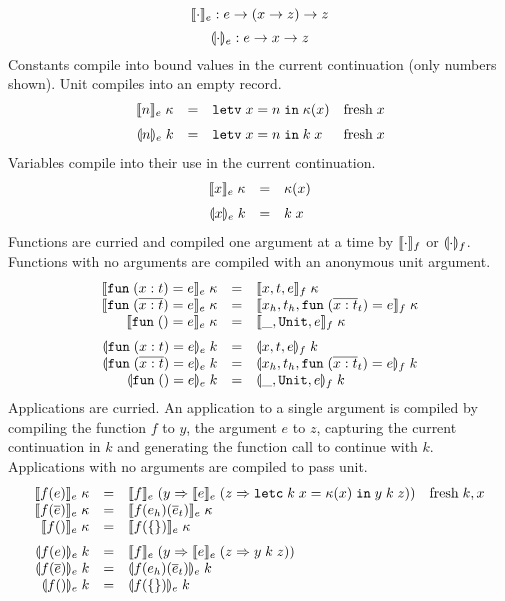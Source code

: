 \documentclass[11pt]{article}
\begin{document}
\[
    \llbracket \cdot \rrbracket_e : e -> (x -> z) -> z
\]
\[
    \llparenthesis \cdot \rrparenthesis_e : e -> x -> z
\]
Constants compile into bound values in the current continuation (only numbers shown).
Unit compiles into an empty record.
\[
\begin{array}{rcll}
\cmpk{e}{\nume{n}} & = &
  \letv{x}{n}{\kappa(x)}   & \fresh{x} \medskip \\

\tcmpk{e}{\nume{n}} & = &
  \letv{x}{n}{\appc{k}{x}} & \fresh{x} \\
\end{array}
\]
Variables compile into their use in the current continuation.
\[
\begin{array}{rcll}
\cmpk{e}{\idne{x}} & = &
  \kappa(x) \medskip \\

\tcmpk{e}{\idne{x}} & = &
  \appc{k}{x} \\
\end{array}
\]
Functions are curried and compiled one argument at a time by $\llbracket \cdot \rrbracket_f$ or $\llparenthesis \cdot \rrparenthesis_f$.
Functions with no arguments are compiled with an anonymous unit argument.
\[
\begin{array}{rcll}
\cmpk{e}{\fune{\arge{x}{t}}{e}} & = &
  \cmpk{f}{x,t,e}
  \\
\cmpk{e}{\fune{\repo{\arge{x}{t}}}{e}} & = &
  \cmpk{f}{x_h,t_h,\fune{\repo{\arge{x}{t}}_t}{e}}
  \\
\cmpk{e}{\fune{}{e}} & = &
  \cmpk{f}{\_,\unity,e} \medskip
  \\
\tcmpk{e}{\fune{\arge{x}{t}}{e}} & = &
  \tcmpk{f}{x,t,e}
  \\
\tcmpk{e}{\fune{\repo{\arge{x}{t}}}{e}} & = &
  \tcmpk{f}{x_h,t_h,\fune{\repo{\arge{x}{t}}_t}{e}}
  \\
\tcmpk{e}{\fune{}{e}} & = &
  \tcmpk{f}{\_,\unity,e}
  \\
\end{array}
\]
Applications are curried.
An application to a single argument is compiled by compiling the function $f$ to $y$, the argument $e$ to $z$, capturing the current continuation in $k$ and generating the function call to continue with $k$.
Applications with no arguments are compiled to pass unit.
\[
\begin{array}{rcll}
\cmpk{e}{\appe{f}{e}} & = &
  \cmpin{e}{f}{(y => \cmpin{e}{e}{(z => \letc{k}{x}{\kappa(x)}{\appf{y}{k}{z}})})} &
  \fresh{k,x} \\
\cmpk{e}{\appe{f}{\repo{e}}} & = &
  \cmpk{e}{\appe{\appe{f}{e_h}}{\repo{e}_t}} \\
\cmpk{e}{\appe{f}{}} & = &
  \cmpk{e}{\appe{f}{\unie}} \medskip
  \\
\tcmpk{e}{\appe{f}{e}} & = &
  \cmpin{e}{f}{(y => \cmpin{e}{e}{(z => \appf{y}{k}{z})})} \\
\tcmpk{e}{\appe{f}{\repo{e}}} & = &
  \tcmpk{e}{\appe{\appe{f}{e_h}}{\repo{e}_t}} \\
\tcmpk{e}{\appe{f}{}} & = &
  \tcmpk{e}{\appe{f}{\unie}}
\end{array}
\]
\end{document}
